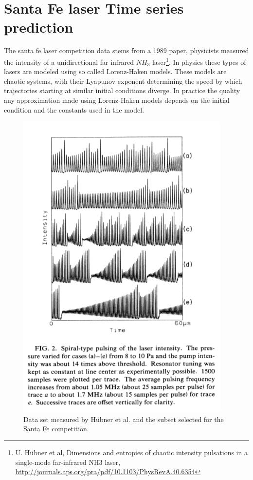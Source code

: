 \section{Santa Fe laser Time series prediction}
The santa fe laser competition data stems from a 1989 paper, physicists measured the intensity of a unidirectional far infrared $NH_3$ laser\footnote{U. H\"{u}bner et al, Dimensions and entropies of chaotic intensity pulsations in a single-mode far-infrared NH3 laser, \url{http://journals.aps.org/pra/pdf/10.1103/PhysRevA.40.6354}}. In physics these types of lasers are modeled using so called Lorenz-Haken models. These models are chaotic systems, with their Lyapunov exponent determining the speed by which trajectories starting at similar initial conditions diverge. In practice the quality any approximation made using Lorenz-Haken models depends on the initial condition and the constants used in the model. 
\begin{figure}
\centering
\includegraphics[scale = 0.25]{../src/figure/origPaper.png}

\caption{Data set measured by H\"{u}bner et al. and the subset selected for the Santa Fe competition.}
\label{fig:origAndSel}
\end{figure}
